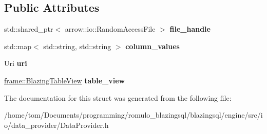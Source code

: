 \subsection*{Public Attributes}
\begin{DoxyCompactItemize}
\item 
\mbox{\label{structral_1_1io_1_1data__handle_a67533fb3372b794e513bb2c7942a3678}} 
std\+::shared\+\_\+ptr$<$ arrow\+::io\+::\+Random\+Access\+File $>$ {\bfseries file\+\_\+handle}
\item 
\mbox{\label{structral_1_1io_1_1data__handle_a3afdfd393265517c1fb8f1cb5800a683}} 
std\+::map$<$ std\+::string, std\+::string $>$ {\bfseries column\+\_\+values}
\item 
\mbox{\label{structral_1_1io_1_1data__handle_aea83e0148a83db382f650224cf50afc6}} 
Uri {\bfseries uri}
\item 
\mbox{\label{structral_1_1io_1_1data__handle_a63f2b69be884e808cc4cc0ca66df6599}} 
\hyperlink{classral_1_1frame_1_1BlazingTableView}{frame\+::\+Blazing\+Table\+View} {\bfseries table\+\_\+view}
\end{DoxyCompactItemize}


The documentation for this struct was generated from the following file\+:\begin{DoxyCompactItemize}
\item 
/home/tom/\+Documents/programming/romulo\+\_\+blazingsql/blazingsql/engine/src/io/data\+\_\+provider/Data\+Provider.\+h\end{DoxyCompactItemize}
